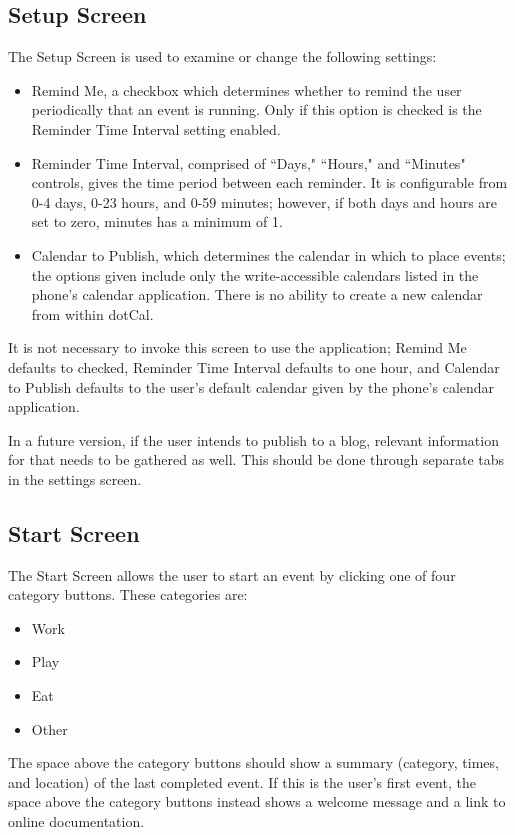 \documentclass[11pt]{article}
\begin{document}
\subsection{Setup Screen} 

The Setup Screen is used to examine or change the following settings:
\begin{itemize}
	\item{Remind Me, a checkbox which determines whether to remind the user periodically that an event is running. Only if this option is checked is the Reminder Time Interval setting enabled.}
	\item{Reminder Time Interval, comprised of ``Days," ``Hours," and ``Minutes" controls, gives the time period between each reminder. It is configurable from 0-4 days, 0-23 hours, and 0-59 minutes; however, if both days and hours are set to zero, minutes has a minimum of 1.}
	\item{Calendar to Publish, which determines the calendar in which to place events; the options given include only the write-accessible calendars listed in the phone's calendar application. There is no ability to create a new calendar from within dotCal.}
\end{itemize}

It is not necessary to invoke this screen to use the application; Remind Me defaults to checked, Reminder Time Interval defaults to one hour, and Calendar to Publish defaults to the user's default calendar given by the phone's calendar application.

In a future version, if the user intends to publish to a blog, relevant information for that needs to be gathered as well. This should be done through separate tabs in the settings screen. 


\subsection{Start Screen}

The Start Screen allows the user to start an event by clicking one of four category buttons. These categories are:

\begin{itemize}
	\item{Work} 
	\item{Play}
	\item{Eat}
	\item{Other}
\end{itemize}

The space above the category buttons should show a summary (category, times, and location) of the last completed event. If this is the user's first event, the space above the category buttons instead shows a welcome message and a link to online documentation.
\end{document}
